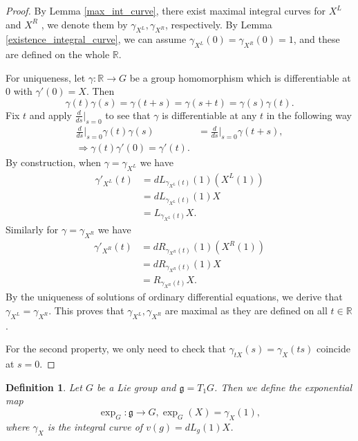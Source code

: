 \documentclass{article}
\newtheorem{definition}{Definition}[section]
\numberwithin{equation}{section}
\begin{document}
\begin{proof}
By Lemma \ref{max_int_curve}, there exist maximal integral curves for $X^L$ and $X^R$ , we denote them by $\gamma_{X^L},\gamma_{X^R}$, respectively. By Lemma \ref{existence_integral_curve}, we can assume $\gamma_{X^L}(0)=\gamma_{X^R}(0)=1$, and these are defined on the whole $\mathbb{R}$.\\
\par For uniqueness, let $\gamma:\mathbb{R}\to G$ be a group homomorphism which is differentiable at $0$ with $\gamma'(0)=X$. Then
\begin{equation}
\label{commutativity_curve}
\gamma(t)\gamma(s) = \gamma(t+s)=\gamma(s+t)=\gamma(s)\gamma(t).
\end{equation}
Fix $t$ and apply ${\frac {d} {ds}}|_{s=0}$ to see that $\gamma$ is differentiable at any $t$ in the following way
\begin{align*}
{\frac d {ds}}|_{s=0}\gamma(t)\gamma(s) &= {\frac d {ds}}|_{s=0}\gamma(t+s),\\
\Rightarrow\gamma(t)\gamma'(0) = \gamma'(t).
\end{align*}
By construction, when $\gamma=\gamma_{X^L}$ we have
\begin{align*}
\gamma'_{X^L}(t) &= dL_{\gamma_{X^L}(t)}(1)(X^L(1))\\
& = dL_{\gamma_{X^L}(t)}(1)X\\
& = L_{\gamma_{X^L}(t)}X.
\end{align*}
Similarly for $\gamma=\gamma_{X^R}$ we have
\begin{align*}
\gamma'_{X^R}(t) &= dR_{\gamma_{X^R}(t)}(1)(X^R(1))\\
& = dR_{\gamma_{X^R}(t)}(1)X\\
& = R_{\gamma_{X^R}(t)}X.
\end{align*}
By the uniqueness of solutions of ordinary differential equations, we derive that $\gamma_{X^L}=\gamma_{X^R}$.
This proves that $\gamma_{X^L},\gamma_{X^R}$ are maximal as they are defined on all $t\in\mathbb{R}$.\\
\par For the second property, we only need to check that $\gamma_{tX}(s)=\gamma_X(ts)$ coincide at $s=0$.
\end{proof}

\begin{definition}
Let $G$ be a Lie group and $\mathfrak{g}=T_1G$. Then we define the exponential map
\begin{equation*}
\exp_G:\mathfrak{g}\to G, \exp_G(X) = \gamma_X(1),
\end{equation*}
where $\gamma_X$ is the integral curve of $v(g)=dL_{g}(1)X$.
\end{definition}
\end{document}
